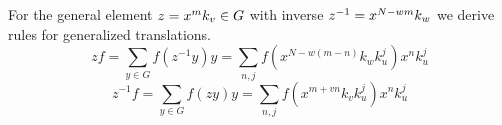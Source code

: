 For the general element $z = x^m k_v \in G$ with 
inverse $z^{-1}=x^{N-wm} k_w$ %
we derive rules for generalized translations.
\begin{equation*}
  zf = \sum_{y\in G} f(z^{-1}y)y= \sum_{n,j} f(x^{N-w(m-n)} k_w k_u^j)x^n k_u^j
\end{equation*}
\begin{equation*}
  z^{-1}f = \sum_{y\in G} f(zy)y= \sum_{n,j} f(x^{m+vn} k_vk_u^j)x^n k_u^j
\end{equation*}

